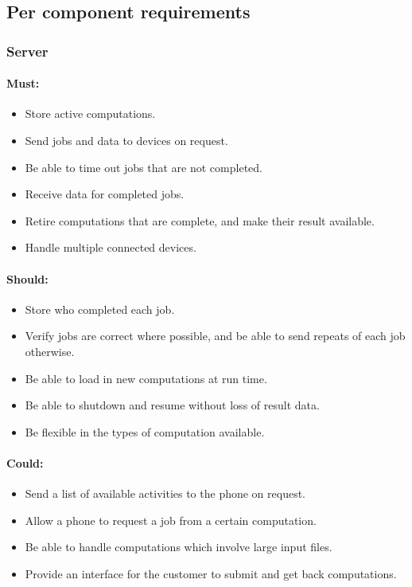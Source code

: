 \documentclass[a4paper,10pt]{article}
\begin{document}
\subsection{Per component requirements}

\subsubsection{Server}

\paragraph{Must:}

\begin{itemize}
\item Store active computations.
\item Send jobs and data to devices on request.
\item Be able to time out jobs that are not completed.
\item Receive data for completed jobs.
\item Retire computations that are complete, and make their result available.
\item Handle multiple connected devices.
\end{itemize}

\paragraph{Should:}

\begin{itemize}
\item Store who completed each job.
\item Verify jobs are correct where possible, and be able to send repeats of each job otherwise.
\item Be able to load in new computations at run time.
\item Be able to shutdown and resume without loss of result data.
\item Be flexible in the types of computation available.
\end{itemize}

\paragraph{Could:}

\begin{itemize}
\item Send a list of available activities to the phone on request.
\item Allow a phone to request a job from a certain computation.
\item Be able to handle computations which involve large input files.
\item Provide an interface for the customer to submit and get back computations.
\end{itemize}
\end{document}
